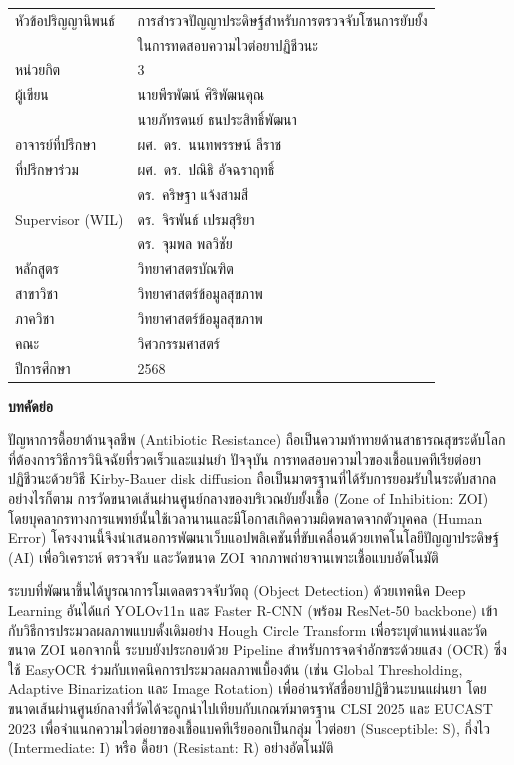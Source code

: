 \begin{tabular}{@{}lp{10cm}@{}}
  หัวข้อปริญญานิพนธ์  & การสำรวจปัญญาประดิษฐ์สำหรับการตรวจจับโซนการยับยั้ง \\
                      & ในการทดสอบความไวต่อยาปฏิชีวนะ \\[0.3cm]
  หน่วยกิต            & 3 \\[0.2cm]
  ผู้เขียน             & นายพีรพัฒน์ ศิริพัฒนคุณ \\
                      & นายภัทรดนย์ ธนประสิทธิ์พัฒนา \\[0.3cm]
  อาจารย์ที่ปรึกษา     & ผศ.\ ดร.\ นนทพรรษน์ ลีราช \\[0.2cm]
  ที่ปรึกษาร่วม        & ผศ.\ ดร.\ ปณิธิ อัจฉราฤทธิ์ \\
                      & ดร.\ คริษฐา แจ้งสามสี \\[0.2cm]
  Supervisor (WIL)    & ดร.\ จิรพันธ์ เปรมสุริยา \\
                      & ดร.\ จุมพล พลวิชัย \\[0.3cm]
  หลักสูตร             & วิทยาศาสตรบัณฑิต \\[0.1cm]
  สาขาวิชา            & วิทยาศาสตร์ข้อมูลสุขภาพ \\[0.1cm]
  ภาควิชา             & วิทยาศาสตร์ข้อมูลสุขภาพ \\[0.1cm]
  คณะ                 & วิศวกรรมศาสตร์ \\[0.1cm]
  ปีการศึกษา          & 2568 \\
\end{tabular}

\vspace{1cm}
\begin{center}\textbf{บทคัดย่อ}\end{center}

\hspace{\parindent}%
ปัญหาการดื้อยาต้านจุลชีพ (Antibiotic Resistance) ถือเป็นความท้าทายด้านสาธารณสุขระดับโลกที่ต้องการวิธีการวินิจฉัยที่รวดเร็วและแม่นยำ ปัจจุบัน การทดสอบความไวของเชื้อแบคทีเรียต่อยาปฏิชีวนะด้วยวิธี Kirby-Bauer disk diffusion ถือเป็นมาตรฐานที่ได้รับการยอมรับในระดับสากล อย่างไรก็ตาม การวัดขนาดเส้นผ่านศูนย์กลางของบริเวณยับยั้งเชื้อ (Zone of Inhibition: ZOI) โดยบุคลากรทางการแพทย์นั้นใช้เวลานานและมีโอกาสเกิดความผิดพลาดจากตัวบุคคล (Human Error) โครงงานนี้จึงนำเสนอการพัฒนาเว็บแอปพลิเคชันที่ขับเคลื่อนด้วยเทคโนโลยีปัญญาประดิษฐ์ (AI) เพื่อวิเคราะห์ ตรวจจับ และวัดขนาด ZOI จากภาพถ่ายจานเพาะเชื้อแบบอัตโนมัติ

ระบบที่พัฒนาขึ้นได้บูรณาการโมเดลตรวจจับวัตถุ (Object Detection) ด้วยเทคนิค Deep Learning อันได้แก่ YOLOv11n และ Faster R-CNN (พร้อม ResNet-50 backbone) เข้ากับวิธีการประมวลผลภาพแบบดั้งเดิมอย่าง Hough Circle Transform เพื่อระบุตำแหน่งและวัดขนาด ZOI นอกจากนี้ ระบบยังประกอบด้วย Pipeline สำหรับการจดจำอักขระด้วยแสง (OCR) ซึ่งใช้ EasyOCR ร่วมกับเทคนิคการประมวลผลภาพเบื้องต้น (เช่น Global Thresholding, Adaptive Binarization และ Image Rotation) เพื่ออ่านรหัสชื่อยาปฏิชีวนะบนแผ่นยา โดยขนาดเส้นผ่านศูนย์กลางที่วัดได้จะถูกนำไปเทียบกับเกณฑ์มาตรฐาน CLSI 2025 และ EUCAST 2023 เพื่อจำแนกความไวต่อยาของเชื้อแบคทีเรียออกเป็นกลุ่ม ไวต่อยา (Susceptible: S), กึ่งไว (Intermediate: I) หรือ ดื้อยา (Resistant: R) อย่างอัตโนมัติ

